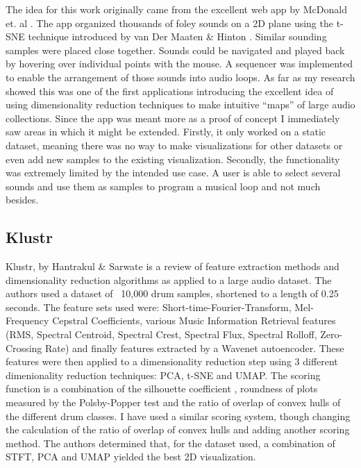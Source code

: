 \documentclass[a4paper, 12pt, twoside]{report}
\begin{document}
The idea for this work originally came from the excellent web app by McDonald et. al \cite{inf_drum_machine}. The app organized thousands of foley sounds on a 2D plane using the t-SNE technique introduced by van Der Maaten \& Hinton \cite{tsne}. Similar sounding samples were placed close together. Sounds could be navigated and played back by hovering over individual points with the mouse. A sequencer was implemented to enable the arrangement of those sounds into audio loops. As far as my research showed this was one of the first applications introducing the excellent idea of using dimensionality reduction techniques to make intuitive ``maps'' of large audio collections. Since the app was meant more as a proof of concept I immediately saw areas in which it might be extended. Firstly, it only worked on a static dataset, meaning there was no way to make visualizations for other datasets or even add new samples to the existing visualization. Secondly, the functionality was extremely limited by the intended use case. A user is able to select several sounds and use them as samples to program a musical loop and not much besides.
\subsection{Klustr}
\label{sec:org02aa748}

Klustr, by Hantrakul \& Sarwate \cite{klustr} is a review of feature extraction methods and dimensionality reduction algorithms as applied to a large audio dataset. The authors used a dataset of ~10,000 drum samples, shortened to a length of 0.25 seconds. The feature sets used were: Short-time-Fourier-Transform, Mel-Frequency Cepstral Coefficients, various Music Information Retrieval features (RMS, Spectral Centroid, Spectral Crest, Spectral Flux, Spectral Rolloff, Zero-Crossing Rate) and finally features extracted by a Wavenet autoencoder. These features were then applied to a dimensionality reduction step using 3 different dimenionality reduction techniques: PCA, t-SNE and UMAP. The scoring function is a combination of the silhouette coefficient \cite{silhouette}, roundness of plots measured by the Polsby-Popper test \cite{popper} and the ratio of overlap of convex hulls of the different drum classes. I have used a similar scoring system, though changing the calculation of the ratio of overlap of convex hulls and adding another scoring method. The authors determined that, for the dataset used, a combination of STFT, PCA and UMAP yielded the best 2D visualization.
\end{document}
